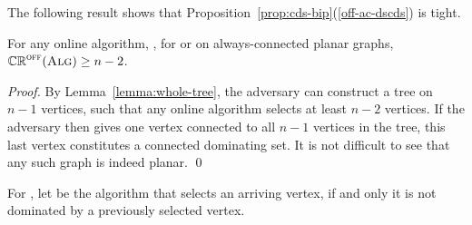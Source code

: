 The following result shows that
Proposition~\ref{prop:cds-bip}(\ref{off-ac-dscds}) is tight.

\begin{proposition}
For any online algorithm, \A, for \ds or \cds on always-connected
planar graphs, $\mathbb{CR}^{\textsc{off}}(\operatorname{\textsc{Alg}}) \geq n-2$.
\end{proposition}
\begin{proof}
By Lemma~\ref{lemma:whole-tree}, the adversary can construct a tree on
$n-1$ vertices, such that any online algorithm selects at least $n-2$
vertices.
If the adversary then gives one vertex connected to all $n-1$ vertices
in the tree, this last vertex constitutes a connected dominating set.
It is not difficult to see that any such graph is indeed planar.
\qed\end{proof}


For \ds,
let \greedy be the algorithm that selects an
arriving vertex, if and only it is not dominated by a previously
selected vertex.


